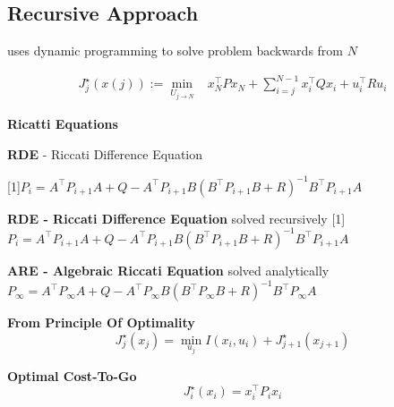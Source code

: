 \subsection{Recursive Approach}

uses dynamic programming to solve problem backwards from $N$

\[\begin{aligned}
		J_j^\star(x(j)) :=
		\min_{U_{j\to N}} & x_N^\top P x_N \!+
		\sum_{i=j}^{N-1}x_i^\top Q x_i + u_i^\top R u_i
	\end{aligned}\]

\begin{sstTitleBox}[ForestGreen]{\textbf{\large
			Ricatti Equations
		}
	}


	\begin{sstTitleBox}[ForestGreen]
		{\color{white}\textbf{RDE} - Riccati Difference Equation}

		\scalebox{0.97}[1]{$
				\scriptstyle
				P_i = A^\top P_{i+1} A
				+ Q - A^\top P_{i+1} B
				(B^\top P_{i+1} B + R)^{-1}
				B^\top P_{i+1} A$}
	\end{sstTitleBox}

	\begin{sstFrame}[ForestGreen]
		\color{white}
		{\textbf{RDE - Riccati Difference Equation} solved recursively}
		\scalebox{0.97}[1]{$
				\scriptstyle
				P_i = A^\top P_{i+1} A
				+ Q - A^\top P_{i+1} B
				(B^\top P_{i+1} B + R)^{-1}
				B^\top P_{i+1} A$}
	\end{sstFrame}

	\begin{sstFrame}[ForestGreen]
		\color{white}
		{\textbf{ARE - Algebraic Riccati Equation} solved analytically}
		{\center$\scriptstyle
				P_\infty = A^\top P_\infty A
				+ Q - A^\top P_\infty B
				(B^\top P_\infty B + R)^{-1}
				B^\top P_\infty A$}
	\end{sstFrame}

\end{sstTitleBox}

\begin{minipage}[t]{0.64\linewidth}
	\textbf{From Principle Of Optimality}
	\[
		J_j^\star(x_j) =
		\min_{u_j} I(x_i,u_i) + J_{j+1}^\star(x_{j+1})
	\]
\end{minipage}
\begin{minipage}[t]{0.32\linewidth}
	\textbf{Optimal Cost-To-Go}
	\[
		J_i^\star(x_i) = x_i^\top P_i x_i
	\]
\end{minipage}

